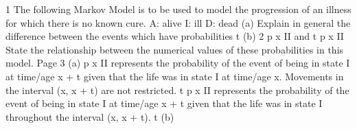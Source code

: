\documentclass[a4paper,1pt]{article}
\begin{document}
1
The following Markov Model is to be used to model the progression of an illness
for which there is no known cure.
A: alive
I: ill
D: dead
(a)
Explain in general the difference between the events which have
probabilities
t
(b)
2
p x II and t p x II
State the relationship between the numerical values of these probabilities
in this model.
Page 3 %
(a)
p x II represents the probability of the event of being in state I at time/age
x + t given that the life was in state I at time/age x. Movements in the
interval (x, x + t) are not restricted.
t
p x II represents the probability of the event of being in state I at time/age
x + t given that the life was in state I throughout the interval (x, x + t).
t
(b)
\end{document}
